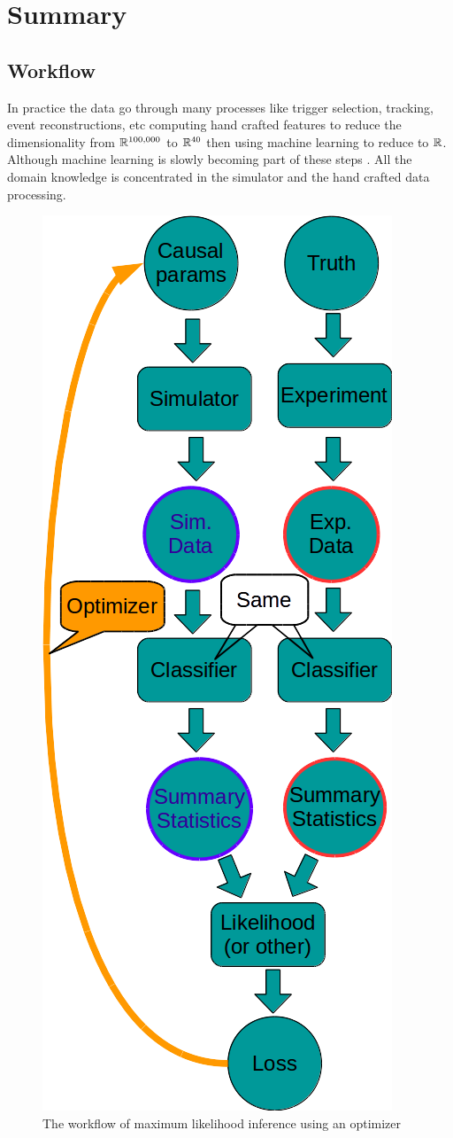 \section{Summary} %
\label{sec:summary}


\subsection{Workflow} %
\label{sub:workflow}


In practice the data go through many processes like trigger selection, tracking, event reconstructions, etc computing hand crafted features to reduce the dimensionality from $\mathbb{R}^{100,000}$ to $\mathbb{R}^{40}$ then using machine learning to reduce to $\mathbb{R}$.
Although machine learning is slowly becoming part of these steps \needcite.
All the domain knowledge is concentrated in the simulator and the hand crafted data processing.


\begin{figure}[htb]
    \centering
    \includegraphics[width=0.5\linewidth]{workflow}
    \caption{The workflow of maximum likelihood inference using an optimizer}
    \label{fig:workflow}
\end{figure}


